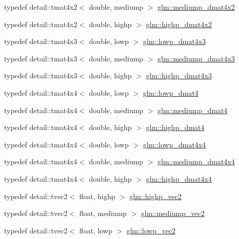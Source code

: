 \begin{CompactItemize}
\item 
typedef detail::tmat4x2$<$ double, mediump $>$ \hyperlink{group__core__precision_g03056b616496470371473cd5df4dc1f8}{glm::mediump\_\-dmat4x2}
\item 
typedef detail::tmat4x2$<$ double, highp $>$ \hyperlink{group__core__precision_ga4fb1ed350a6cd053abb9b093d13ce0d}{glm::highp\_\-dmat4x2}
\item 
typedef detail::tmat4x3$<$ double, lowp $>$ \hyperlink{group__core__precision_gbc1be51eb0cae7cd4b1d6483a954c35d}{glm::lowp\_\-dmat4x3}
\item 
typedef detail::tmat4x3$<$ double, mediump $>$ \hyperlink{group__core__precision_gfa1ba33d2748737129cde471fedbf9c5}{glm::mediump\_\-dmat4x3}
\item 
typedef detail::tmat4x3$<$ double, highp $>$ \hyperlink{group__core__precision_gf8aeba0eecc5c651e0f06414b6e37754}{glm::highp\_\-dmat4x3}
\item 
typedef detail::tmat4x4$<$ double, lowp $>$ \hyperlink{group__core__precision_gea69794db4e619881b77d37bf84b337e}{glm::lowp\_\-dmat4}
\item 
typedef detail::tmat4x4$<$ double, mediump $>$ \hyperlink{group__core__precision_g73de517f040f7d50746bbe273a396685}{glm::mediump\_\-dmat4}
\item 
typedef detail::tmat4x4$<$ double, highp $>$ \hyperlink{group__core__precision_g9a5d95e476d451d28d3939ac7f124baf}{glm::highp\_\-dmat4}
\item 
typedef detail::tmat4x4$<$ double, lowp $>$ \hyperlink{group__core__precision_gc762dec40f53114dfe6894499a2c9a79}{glm::lowp\_\-dmat4x4}
\item 
typedef detail::tmat4x4$<$ double, mediump $>$ \hyperlink{group__core__precision_gd64329d45b05417ccf0cc3c23f584d26}{glm::mediump\_\-dmat4x4}
\item 
typedef detail::tmat4x4$<$ double, highp $>$ \hyperlink{group__core__precision_g1c0a2edbde597b59e9005691a224b208}{glm::highp\_\-dmat4x4}
\item 
typedef detail::tvec2$<$ float, highp $>$ \hyperlink{group__core__precision_g37645abcfcc1278567e99f1ca492bfbb}{glm::highp\_\-vec2}
\item 
typedef detail::tvec2$<$ float, mediump $>$ \hyperlink{group__core__precision_g1365858c541931eb8a7473fa85a1d1cf}{glm::mediump\_\-vec2}
\item 
typedef detail::tvec2$<$ float, lowp $>$ \hyperlink{group__core__precision_gc63d79532b7e8d18f579ebe63e4fde49}{glm::lowp\_\-vec2}
\item 

\end{CompactItemize}
